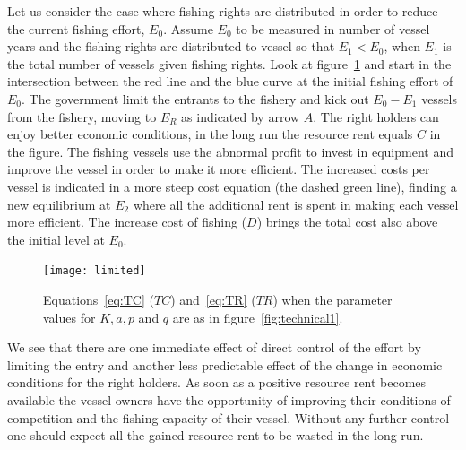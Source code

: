 \documentclass[11pt,fleqn]{book} %
\begin{document}
Let us consider the case where fishing rights are distributed in order to reduce the current fishing effort, $E_0$. Assume $E_0$ to be measured in number of vessel years and the fishing rights are distributed to vessel so that $E_1 < E_0$, when $E_1$ is the total number of vessels given fishing rights. Look at figure~\ref{fig:limited} and start in the intersection between the red line and the blue curve at the initial fishing effort of $E_0$. The government limit the entrants to the fishery and kick out $E_0-E_1$ vessels from the fishery, moving to $E_R$ as indicated by arrow $A$. The right holders can enjoy better economic conditions, in the long run the resource rent equals $C$ in the figure. The fishing vessels use the abnormal profit to invest in equipment and improve the vessel in order to make it more efficient. The increased costs per vessel is indicated in a more steep cost equation (the dashed green line), finding a new equilibrium at $E_2$ where all the additional rent is spent in making each vessel more efficient. The increase cost of fishing ($D$) brings the total cost also above the initial level at $E_0$.
\hfill
\begin{figure}[ht]
\centering
\texttt{[image: limited]}
\caption{Equations~\ref{eq:TC} ($TC$) and~\ref{eq:TR} ($TR$) when the parameter values for $K, a, p$ and $q$ are as in figure~\ref{fig:technical1}. }
\label{fig:limited}
\end{figure}

We see that there are one immediate effect of direct control of the effort by limiting the entry and another less predictable effect of the change in economic conditions for the right holders. As soon as a positive resource rent becomes available the vessel owners have the opportunity of improving their conditions of competition and the fishing capacity of their vessel. Without any further control one should expect all the gained resource rent to be wasted in the long run.
\end{document}
